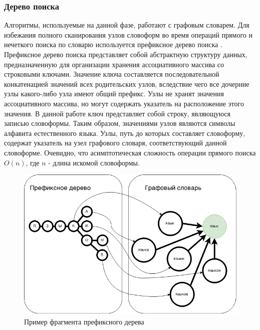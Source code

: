 \subsubsection{Дерево поиска}
Алгоритмы, используемые на данной фазе, работают с графовым словарем. Для избежания полного сканирования узлов словоформ во время операций прямого и нечеткого поиска по словарю используется префиксное дерево поиска \cite{knuth}. Префиксное дерево поиска представляет собой абстрактную структуру данных, предназначенную для организации хранения ассоциативного массива со строковыми ключами. Значение ключа составляется последовательной конкатенацией значений всех родительских узлов, вследствие чего все дочерние узлы какого-либо узла имеют общий префикс. Узлы не хранят значения ассоциативного массива, но могут содержать указатель на расположение этого значения. В данной работе ключ представляет собой строку, являющуюся записью словоформы. Таким образом, значениями узлов являются символы алфавита естественного языка. Узлы, путь до которых составляет словоформу, содержат указатель на узел графового словаря, соответствующий данной словоформе. Очевидно, что асимптотическая сложность операции прямого поиска \(O(n)\), где \(n\) - длина искомой словоформы.
\begin{figure}[H]
	\centering
	\includegraphics[scale=0.6]{img/prefixtree.png}
	\caption{Пример фрагмента префиксного дерева}
\end{figure}

